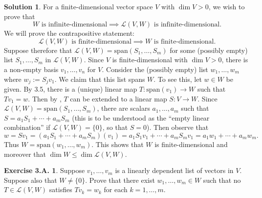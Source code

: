 \documentclass[12pt]{article}
\theoremstyle{definition}
\theoremstyle{exercise}
\newtheorem{exercise}{Exercise 3.A.}
\theoremstyle{solution}
\newtheorem*{solution}{Solution}
\newcommand{\lmap}{\mathcal{L}}
\newcommand{\Span}{\text{span}}
\begin{document}
\begin{solution}
    For a finite-dimensional vector space \( V \) with \( \dim V > 0 \), we wish to prove that
    \[
        W \text{ is infinite-dimensional} \implies \lmap(V, W) \text{ is infinite-dimensional.}
    \]
    We will prove the contrapositive statement:
    \[
        \lmap(V, W) \text{ is finite-dimensional} \implies W \text{ is finite-dimensional.}
    \]
    Suppose therefore that \( \lmap(V, W) = \Span(S_1, \ldots, S_m) \) for some (possibly empty) list \( S_1, \ldots, S_m \) in \( \lmap(V, W) \). Since \( V \) is finite-dimensional with \( \dim V > 0 \), there is a non-empty basis \( v_1, \ldots, v_n \) for \( V \). Consider the (possibly empty) list \( w_1, \ldots, w_m \) where \( w_j := S_j v_1 \). We claim that this list spans \( W \). To see this, let \( w \in W \) be given. By 3.5, there is a (unique) linear map \( T : \Span(v_1) \to W \) such that \( T v_1 = w \). Then by , \( T \) can be extended to a linear map \( S : V \to W \). Since \( \lmap(V, W) = \Span(S_1, \ldots, S_m) \), there are scalars \( a_1, \ldots, a_m \) such that \( S = a_1 S_1 + \cdots + a_m S_m \) (this is to be understood as the ``empty linear combination'' if \( \lmap(V, W) = \{ 0 \} \), so that \( S = 0 \)). Then observe that
    \[
        w = S v_1 = (a_1 S_1 + \cdots + a_m S_m)(v_1) = a_1 S_1 v_1 + \cdots + a_m S_m v_1 = a_1 w_1 + \cdots + a_m w_m.
    \]
    Thus \( W = \Span(w_1, \ldots, w_m) \). This shows that \( W \) is finite-dimensional and moreover that \( \dim W \leq \dim \lmap(V, W) \).
\end{solution}

\begin{exercise}
\label{ex:13}
    Suppose \( v_1, \ldots, v_m \) is a linearly dependent list of vectors in \( V \). Suppose also that \( W \neq \{ 0 \} \). Prove that there exist \( w_1, \ldots, w_m \in W \) such that no \( T \in \lmap(V, W) \) satisfies \( T v_k = w_k \) for each \( k = 1, \ldots, m \).
\end{exercise}
\end{document}

